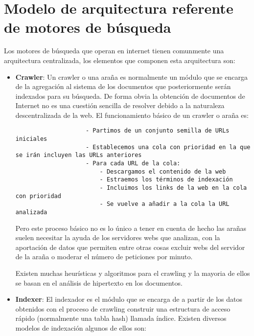 \documentclass[a4paper, 11pt]{article} %
\begin{document}
	\section{Modelo de arquitectura referente de motores de búsqueda}
	Los motores de búsqueda que operan en internet tienen comunmente una arquitectura centralizada, los elementos que componen esta arquitectura son:
		\begin{itemize}
			\item \textbf{Crawler}: Un crawler o una araña es normalmente un módulo que se encarga de la agregación al sistema de los documentos que posteriormente serán indexados para su búsqueda. De forma obvia la obtención de documentos de Internet no es una cuestión sencilla de resolver debido a la naturaleza descentralizada de la web. El funcionamiento básico de un crawler o araña es:
				\begin{verbatim}
					- Partimos de un conjunto semilla de URLs iniciales
					- Establecemos una cola con prioridad en la que se irán incluyen las URLs anteriores
					- Para cada URL de la cola:
						- Descargamos el contenido de la web
						- Estraemos los términos de indexación
						- Incluimos los links de la web en la cola con prioridad
						- Se vuelve a añadir a la cola la URL analizada
				\end{verbatim}
				Pero este proceso básico no es lo único a tener en cuenta de hecho las arañas suelen necesitar la ayuda de los servidores webs que analizan, con la aportación de datos que permiten entre otras cosas excluir webs del servidor de la araña o moderar el número de peticiones por minuto.

				Existen muchas heurísticas y algoritmos para el crawling y la mayoria de ellos se basan en el análisis de hipertexto en los documentos.
			\item \textbf{Indexer}: El indexador es el módulo que se encarga de a partir de los datos obtenidos con el proceso de crawling construir una estructura de acceso rápido (normalmente una tabla hash) llamada índice. Existen diversos modelos de indexación algunos de ellos son:


\end{itemize}
\end{document}
